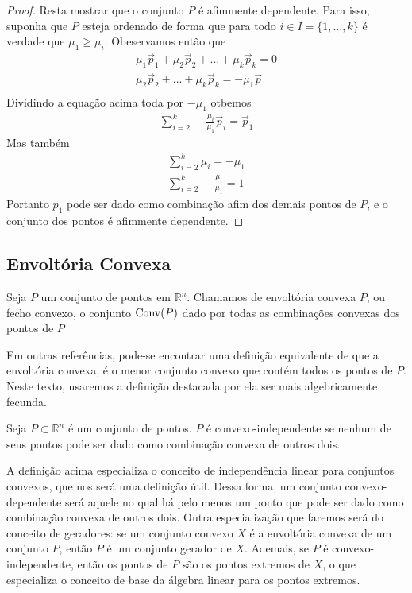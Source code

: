 \begin{lemma:afim}
\begin{proof}
		Resta mostrar que o conjunto $P$ é afimmente dependente. Para isso, suponha
		que $P$ esteja ordenado de forma que para todo $i \in I = \{1, \ldots, k\}$
		é verdade que $\mu_1 \geq \mu_i$. Obeservamos então que
	  \begin{gather*}
	    \mu_1 \vec p_1 + \mu_2 \vec p_2 + \ldots + \mu_k \vec p_k = 0 \\
        \mu_2 \vec p_2 + \ldots + \mu_k \vec p_k = - \mu_1 \vec p_1 \\
	  \end{gather*}
	  Dividindo a equação acima toda por $-\mu_1$ otbemos
	  \begin{gather*}
	    \sum_{i=2}^{k} -\frac{\mu_i}{\mu_1} \vec p_i = \vec p_1
	  \end{gather*}
	  Mas também
	  \begin{gather*}
        \sum_{i=2}^{k} \mu_i = -\mu_1 \\
	    \sum_{i=2}^{k} -\frac{\mu_i}{\mu_1} = 1
	  \end{gather*}
	  Portanto $p_1$ pode ser dado como combinação afim dos demais pontos de
	  $P$, e o conjunto dos pontos é afimmente dependente.
	\end{proof}
\end{lemma:afim}

\subsection{Envoltória Convexa}

\begin{def:convex hull}
	\label{def:convex hull}
	Seja $P$ um conjunto de pontos em $\mathbb{R}^n$. Chamamos de envoltória
	convexa $P$, ou fecho convexo, o conjunto
	$\mathrm{Conv}(P)$ dado por todas as combinações convexas dos pontos de $P$
\end{def:convex hull}

Em outras referências, pode-se encontrar uma definição equivalente de que a
envoltória convexa, é o menor conjunto convexo que contém todos os pontos de $P$.
Neste texto, usaremos a definição destacada por ela ser mais algebricamente fecunda.

\begin{def:independencia convexa}
	Seja $P \subset \mathbb{R}^n$ é um conjunto de pontos. $P$ é convexo-independente
	se nenhum de seus pontos pode ser dado como combinação convexa de outros dois.
\end{def:independencia convexa}

A definição acima especializa o conceito de independência linear para conjuntos convexos,
que nos será uma definição útil. Dessa forma, um conjunto convexo-dependente será aquele
no qual há pelo menos um ponto que pode ser dado como combinação convexa de outros dois.
Outra especialização que faremos será do conceito de geradores: se um conjunto convexo
$X$ é a envoltória convexa de um conjunto $P$, então $P$ é um conjunto gerador de $X$.
Ademais, se $P$ é convexo-independente, então os pontos de $P$ são os pontos extremos
de $X$, o que especializa o conceito de base da álgebra linear para os pontos extremos.

